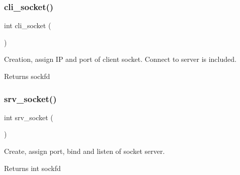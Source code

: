 \subsubsection{cli\+\_\+socket()}
{\footnotesize\ttfamily int cli\+\_\+socket (\begin{DoxyParamCaption}{ }\end{DoxyParamCaption})}



Creation, assign IP and port of client socket. Connect to server is included. 

\begin{DoxyReturn}{Returns}
sockfd 
\end{DoxyReturn}
\mbox{\label{socket_8h_abaa85d7aff16c338adf9a408c151bc28}} 
\subsubsection{srv\+\_\+socket()}
{\footnotesize\ttfamily int srv\+\_\+socket (\begin{DoxyParamCaption}{ }\end{DoxyParamCaption})}



Create, assign port, bind and listen of socket server. 

\begin{DoxyReturn}{Returns}
int sockfd 
\end{DoxyReturn}
